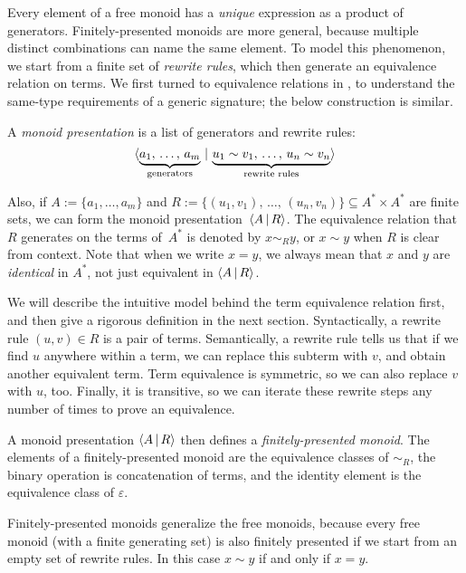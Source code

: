 \documentclass[../generics]{subfiles}
\begin{document}
Every element of a free monoid has a \emph{unique} expression as a product of generators. Finitely-presented monoids are more general, because multiple distinct combinations can name the same element. To model this phenomenon, we start from a finite set of \emph{rewrite rules}, which then generate an equivalence relation on terms. We first turned to equivalence relations in , to understand the same-type requirements of a generic signature; the below construction is similar.

A \emph{monoid presentation} is a list of generators and rewrite rules:
\[\langle  \underbrace{a_1,\,\ldots,\, a_m}_{\text{generators}} \,|\, \underbrace{u_1 \sim v_1,\,\ldots,\, u_n \sim v_n}_{\text{rewrite rules}}\rangle \]

Also, if $A := \{a_1,\ldots, a_m\}$ and $R := \{(u_1,v_1),\,\ldots,\,(u_n,v_n)\}\subseteq A^* \times A^*$ are finite sets, we can form the monoid presentation~$\langle A\,|\,R\rangle$. The equivalence relation that~$R$ generates on the terms of~$A^*$ is denoted by $x\sim_R y$, or $x \sim y$ when $R$ is clear from context. Note that when we write $x=y$, we always mean that $x$ and $y$ are \emph{identical} in $A^*$, not just equivalent in $\langle A\,|\,R\rangle$.

We will describe the intuitive model behind the term equivalence relation first, and then give a rigorous definition in the next section. Syntactically, a rewrite rule $(u,v)\in R$ is a pair of terms. Semantically, a rewrite rule tells us that if we find $u$ anywhere within a term, we can replace this subterm with $v$, and obtain another equivalent term. Term equivalence is symmetric, so we can also replace $v$ with $u$, too. Finally, it is transitive, so we can iterate these rewrite steps any number of times to prove an equivalence.

A monoid presentation $\langle A\,|\,R\rangle$ then defines a \emph{finitely-presented monoid}. The elements of a finitely-presented monoid are the equivalence classes of $\sim_R$, the binary operation is concatenation of terms, and the identity element is the equivalence class of $\varepsilon$. 

\begin{example}
Finitely-presented monoids generalize the free monoids, because every free monoid (with a finite generating set) is also finitely presented if we start from an empty set of rewrite rules. In this case $x\sim y$ if and only if $x=y$.
\end{example}
\end{document}
